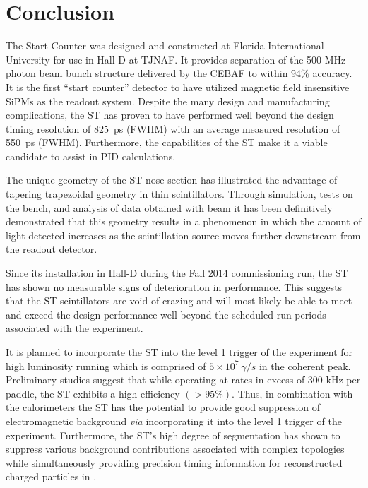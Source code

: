 \section{Conclusion} \label{sec:conclusion}

The \gx{} Start Counter was designed and constructed at Florida International University for use in Hall-D at TJNAF. It provides separation of the 500 MHz photon beam bunch structure delivered by the CEBAF to within 94\% accuracy.  It is the first ``start counter'' detector to have utilized magnetic field insensitive SiPMs as the readout system.  Despite the many design and manufacturing complications, the ST has proven to have performed well beyond the design timing resolution of 825~ps (FWHM) with an average measured resolution of 550~ps (FWHM).  Furthermore, the capabilities of the ST make it a viable candidate to assist in PID calculations.

The unique geometry of the ST nose section has illustrated the advantage of tapering trapezoidal geometry in thin scintillators.  Through simulation, tests on the bench, and analysis of data obtained with beam it has been definitively demonstrated that this geometry results in a phenomenon in which the amount of light detected increases as the scintillation source moves further downstream from the readout detector.

Since its installation in Hall-D during the Fall 2014 commissioning run, the ST has shown no measurable signs of deterioration in performance.  This suggests that the ST scintillators are void of crazing and will most likely be able to meet and exceed the design performance well beyond the scheduled run periods associated with the \gx{} experiment.

It is planned to incorporate the ST into the level 1 trigger of the \gx{} experiment for high luminosity running which is comprised of $5 \times 10^{7}\ \gamma/s$ in the coherent peak.  Preliminary studies suggest that while operating at rates in excess of 300 kHz per paddle, the ST exhibits a high efficiency $(> 95\%)$.  Thus, in combination with the calorimeters the ST has the potential to provide good suppression of electromagnetic background \textit{via} incorporating it into the level 1 trigger of the experiment.  Furthermore, the ST's high degree of segmentation has shown to suppress various background contributions associated with complex topologies while simultaneously providing precision timing information for reconstructed charged particles in \gx{}.